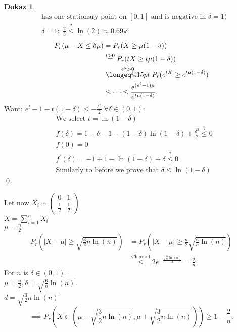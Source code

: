 \documentclass[a4paper, 12pt]{book}
\makeatletter
\theoremstyle{definition}
\newtheorem{pro}[counter]{Dokaz}
\theoremstyle{remark}
\newcommand{\longeq}[1]{\mathrel{\mathpalette\longeq@{#1}}}
\newcommand{\longeq@}[2]{%
  \begingroup
  \sbox\z@{$\m@th#1=$}%
  \ifdim#2<\wd\z@
    \resizebox{#2}{\height}{\box\z@}%
  \else
    \ifdim#2<3\wd\z@
      \hbox to #2{$\m@th#1=\hss=\hss=\hss=$}%
    \else
      \hbox to #2{$\m@th#1=\cleaders\hbox to 0.2\wd\z@{\hss$#1=$\hss}\hfil=$}%
    \fi
  \fi
  \endgroup
}
\makeatother
\begin{document}
\begin{pro}
\begin{align*}
    &\text{has one stationary point on }[0,1]\text{ and is negative in }\delta = 1)\\
    &\delta=1: \; \frac{2}{3} \stackrel{?}{\leq} \ln(2) \approx 0.69 \checkmark
  \end{align*}
  \begin{align*}
    P_r(\mu - X \leq \delta \mu) &= P_r(X \geq \mu(1-\delta)) \\
    &\stackrel{t>0}{=} P_r(tX \geq t\mu(1-\delta)) \\
    &\stackrel{e^y>0}{\longeq{15pt}} P_r(e^{tX} \geq e^{t\mu(1-\delta)}) \\
    &\leq \dots \leq \frac{e^{(e^t-1)\mu}}{e^{t\mu(1-\delta)}}.
  \end{align*}
  Want: $e^t - 1 - t(1-\delta) \leq -\frac{\delta^2}{2} \; \forall \delta \in (0,1)$:
  \begin{align*}
    &\text{We select }t = \ln(1-\delta) \\
    &f(\delta) = 1 - \delta - 1 - (1-\delta) \ln(1-\delta) + \frac{\delta^2}{2} \stackrel{?}{\leq} 0 \\
    &f(0) = 0 \\
    &f^{'}(\delta) = - 1 + 1 - \ln(1-\delta) + \delta \stackrel{?}{\leq} 0 \\
    &\text{Similarly to before we prove that }\delta \leq \ln(1-\delta)
  \end{align*}
  \qed
\end{pro}
Let now $X_i \sim \begin{pmatrix}0 & 1 \\ \frac{1}{2} & \frac{1}{2}\end{pmatrix}$ \\
$X = \sum_{i=1}^{n} X_i$ \\
$\mu = \frac{n}{2}$
\begin{align*}
  P_r\left(|X-\mu| \geq \sqrt{\frac{3}{2}n \ln(n)}\right)
  &= P_r\left(|X-\mu| \geq \frac{n}{2} \sqrt{\frac{6}{n} \ln(n)}\right) \\
  &\stackrel{\text{Chernoff}}{\leq} 2 e^{-\frac{\frac{n}{2} \frac{6}{n} \ln(n)}{3}} = \frac{2}{n};
\end{align*}
For  $n$ is $\delta \in (0,1)$, \\
$\mu = \frac{n}{2}, \delta = \sqrt{\frac{6}{n} \ln(n)}$. \\
$d = \sqrt{\frac{3}{2}n \ln(n)}$
\begin{equation*}
  \implies P_r\left(X \in \left(\mu - \sqrt{\frac{3}{2}n \ln(n)}, \mu + \sqrt{\frac{3}{2}n \ln(n)}\right)\right)
  \geq 1 - \frac{2}{n}.
\end{equation*}
\end{document}
